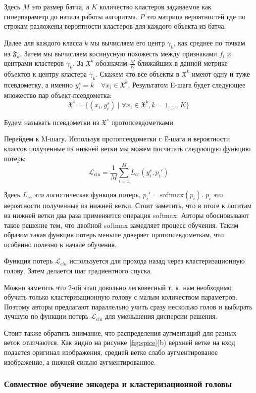 \documentclass[a4paper,12pt]{extarticle}
\begin{document}
Здесь $M$ это 
размер батча, а $K$ количество кластеров задаваемое как 
гиперпараметр до начала работы алгоритма. $P$ это матрица
вероятностей где по строкам разложены вероятности кластеров 
для каждого объекта из батча.

Далее для 
каждого класса $k$ мы вычисляем его центр $\gamma_k$, 
как среднее по точкам из $\mathfrak{F}_k$. Затем 
мы вычисляем косинусную похожесть между признаками $f_i$ 
и центрами кластеров $\gamma_k$. За $\mathfrak{X}^k$ обозначим 
$\frac{M}{K}$ ближайших в данной метрике объектов к 
центру кластера $\gamma_k$. Скажем что все объекты 
в $\mathfrak{X}^k$ имеют одну и туже псевдометку, а именно 
$y_i^s=k\quad \forall x_i\in\mathfrak{X}^k$. Результатом 
E-шага будет следующее множество пар объект-псевдометка:
\[
	\mathfrak{X}^s=\{(x_i, y_i^s)\mid \forall x_i 
	\in \mathfrak{X}^k, k=1,\ldots, K \}
\]

Будем называть псевдометки из $\mathfrak{X}^s$ протопсевдометками.

Перейдем к M-шагу. Используя протопсевдометки с Е-шага и вероятности 
классов полученные из нижней ветки мы можем посчитать следующую функцию 
потерь:
\[
	\mathcal{L}_{clu}=\frac{1}{M}\sum_{i=1}^M L_{ce}(y_i^s, p_i')
\]

Здесь $L_{ce}$ это логистическая функция потерь, $p_i'=\text{softmax}(p_i)$. 
$p_i$ это вероятности полученные из нижней ветки. Стоит заметить, что в итоге к 
логитам из нижней ветки два раза применяется операция softmax. Авторы 
обосновывают такое решение тем, что двойной softmax замедляет процесс обучения. 
Таким образом такая функция потерь меньше доверяет протопсевдометкам, 
что особенно полезно в начале обучения. 

Функция потерь $\mathcal{L}_{clu}$ используется для прохода назад 
через кластеризационную голову. Затем делается шаг градиентного спуска.

Можно заметить что 2-ой этап довольно легковесный т. к. нам необходимо 
обучать только кластеризационную голову с малым количеством параметров. 
Поэтому авторы предлагают параллельно учить сразу несколько голов и выбирать
лучшую по функции потерь $\mathcal{L}_{clu}$ для уменьшения дисперсии решения.

Стоит также обратить внимание, что распределения аугментаций 
для разных веток отличаются. Как видно на рисунке \ref{fig:spice}(b) 
верхней ветке на вход подается оригинал изображения, средней ветке
слабо аугментированое изображение, а нижней сильно аугментированное.

\subsubsection{Совместное обучение энкодера и кластеризационной головы}
\end{document}
